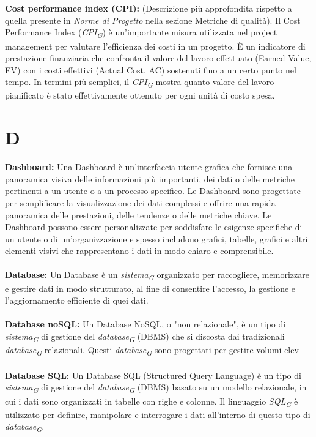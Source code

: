 \documentclass{article}
\begin{document}
\\
\\
\textbf{Cost performance index (CPI):} (Descrizione più approfondita rispetto a quella presente in \textit{Norme di Progetto} nella sezione Metriche di qualità). Il Cost Performance Index (\textit{CPI}\textsubscript{\textit{G}}) è un'importante misura utilizzata nel project management per valutare l'efficienza dei costi in un progetto. È un indicatore di prestazione finanziaria che confronta il valore del lavoro effettuato (Earned Value, EV) con i costi effettivi (Actual Cost, AC) sostenuti fino a un certo punto nel tempo. In termini più semplici, il \textit{CPI}\textsubscript{\textit{G}} mostra quanto valore del lavoro pianificato è stato effettivamente ottenuto per ogni unità di costo spesa.
\pagebreak
\section*{D}
{}
\textbf{Dashboard:} Una Dashboard è un'interfaccia utente grafica che fornisce una panoramica visiva delle informazioni più importanti, dei dati o delle metriche pertinenti a un utente o a un processo specifico. Le Dashboard sono progettate per semplificare la visualizzazione dei dati complessi e offrire una rapida panoramica delle prestazioni, delle tendenze o delle metriche chiave. Le Dashboard possono essere personalizzate per soddisfare le esigenze specifiche di un utente o di un'organizzazione e spesso includono grafici, tabelle, grafici e altri elementi visivi che rappresentano i dati in modo chiaro e comprensibile.
\\
\\
\textbf{Database:} Un Database è un \textit{sistema}\textsubscript{\textit{G}} organizzato per raccogliere, memorizzare e gestire dati in modo strutturato, al fine di consentire l'accesso, la gestione e l'aggiornamento efficiente di quei dati.
\\
\\
\textbf{Database noSQL:} Un Database NoSQL, o "non relazionale", è un tipo di \textit{sistema}\textsubscript{\textit{G}} di gestione del \textit{database}\textsubscript{\textit{G}} (DBMS) che si discosta dai tradizionali \textit{database}\textsubscript{\textit{G}} relazionali. Questi \textit{database}\textsubscript{\textit{G}} sono progettati per gestire volumi elev
\\
\\
\textbf{Database SQL:} Un Database SQL (Structured Query Language) è un tipo di \textit{sistema}\textsubscript{\textit{G}} di gestione del \textit{database}\textsubscript{\textit{G}} (DBMS) basato su un modello relazionale, in cui i dati sono organizzati in tabelle con righe e colonne. Il linguaggio \textit{SQL}\textsubscript{\textit{G}} è utilizzato per definire, manipolare e interrogare i dati all'interno di questo tipo di \textit{database}\textsubscript{\textit{G}}.
\end{document}
